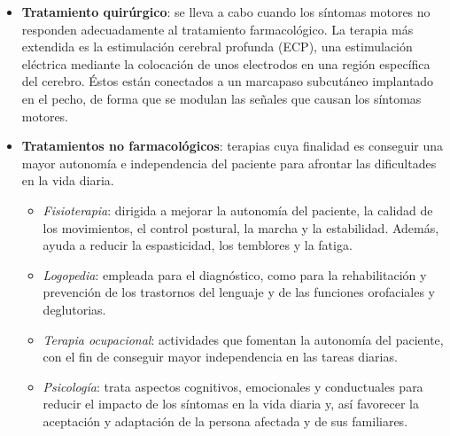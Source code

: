 \begin{itemize}
    \item \textbf{Tratamiento quirúrgico}: se lleva a cabo cuando los síntomas motores no responden adecuadamente al tratamiento farmacológico. La terapia más extendida es la estimulación cerebral profunda (ECP), una estimulación eléctrica mediante la colocación de unos electrodos en una región específica del cerebro. Éstos están conectados a un marcapaso subcutáneo implantado en el pecho, de forma que se modulan las señales que causan los síntomas motores.
    \item \textbf{Tratamientos no farmacológicos}: terapias cuya finalidad es conseguir una mayor autonomía e independencia del paciente para afrontar las dificultades en la vida diaria.
    \begin{itemize}
        \item \textit{Fisioterapia}: dirigida a mejorar la autonomía del paciente, la calidad de los movimientos, el control postural, la marcha y la estabilidad. Además, ayuda a reducir la espasticidad, los temblores y la fatiga.
        \item \textit{Logopedia}: empleada para el diagnóstico, como para la rehabilitación y prevención de los trastornos del lenguaje y de las funciones orofaciales y deglutorias.
        \item \textit{Terapia ocupacional}: actividades que fomentan la autonomía del paciente, con el fin de conseguir mayor independencia en las tareas diarias.
        \item \textit{Psicología}: trata aspectos cognitivos, emocionales y conductuales para reducir el impacto de los síntomas en la vida diaria y, así favorecer la aceptación y adaptación de la persona afectada y de sus familiares.
    \end{itemize}
        
\end{itemize}







